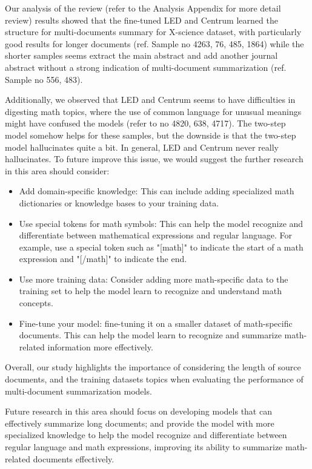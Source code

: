 \documentclass[12pt, twocolumn]{article}
\numberwithin{equation}{section}
\begin{document}
Our analysis of the review (refer to the Analysis Appendix for more detail review) results showed that the fine-tuned LED and Centrum learned the structure for multi-documents summary for X-science dataset, with particularly good results for longer documents (ref. Sample no 4263, 76, 485, 1864) while the shorter samples seems extract the main abstract and add another journal abstract without a strong indication of multi-document summarization (ref. Sample no 556, 483).

Additionally, we observed that LED and Centrum seems to have difficulties in digesting math topics, where the use of common language for unusual meanings might have confused the models (refer to no 4820, 638, 4717).  The two-step model somehow helps for these samples, but the downside is that the two-step model hallucinates quite a bit. In general, LED and Centrum never really hallucinates. To future improve this issue, we would suggest the further research in this area should consider:

\begin{itemize}
    \item Add domain-specific knowledge: This can include adding specialized math dictionaries or knowledge bases to your training data.
    \item Use special tokens for math symbols: This can help the model recognize and differentiate between mathematical expressions and regular language. For example, use a special token such as "[math]" to indicate the start of a math expression and "[/math]" to indicate the end.
    \item Use more training data: Consider adding more math-specific data to the training set to help the model learn to recognize and understand math concepts.
    \item Fine-tune your model: fine-tuning it on a smaller dataset of math-specific documents. This can help the model learn to recognize and summarize math-related information more effectively.
\end{itemize}

Overall, our study highlights the importance of considering the length of source documents, and the training datasets topics when evaluating the performance of multi-document summarization models.

Future research in this area should focus on developing models that can effectively summarize long documents; and provide the model with more specialized knowledge to help the model recognize and differentiate between regular language and math expressions, improving its ability to summarize math-related documents effectively.
\end{document}
